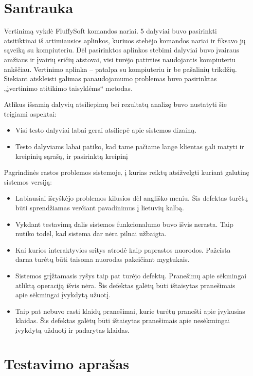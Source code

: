 \section{Santrauka}

	Vertinimą vykdė FluffySoft komandos nariai.
	5 dalyviai buvo pasirinkti atsitiktinai iš artimiausios aplinkos, kuriuos stebėjo komandos nariai ir fiksavo jų sąveiką su kompiuteriu.
	Dėl pasirinktos aplinkos stebimi dalyviai buvo įvairaus amžiaus ir įvairių sričių atstovai, visi turėjo patirties naudojantis kompiuteriu ankščiau.
	Vertinimo aplinka – patalpa su kompiuteriu ir be pašalinių trikdžių.
	Siekiant atskleisti galimas panaudojamumo problemas buvo pasirinktas „įvertinimo atitikimo taisyklėms“ metodas.
	
	Atlikus išsamią dalyvių atsiliepimų bei rezultatų analizę buvo nustatyti šie teigiami aspektai:
	\begin{itemize}
		\item Visi testo dalyviai labai gerai atsiliepė apie sistemos dizainą.
		\item Testo dalyviams labai patiko, kad tame pačiame lange klientas gali matyti ir kreipinių sąrašą, ir pasirinktą kreipinį
	\end{itemize}
	
	Pagrindinės rastos problemos sistemoje, į kurias reiktų atsižvelgti kuriant galutinę sistemos versiją:
	\begin{itemize}
		\item Labiausiai išryškėjo problemos kilusios dėl angliško meniu.
		Šis defektas turėtų būti sprendžiamas verčiant pavadinimus į lietuvių kalbą.
		\item Vykdant testavimą dalis sistemos funkcionalumo buvo išvis nerasta.
		Taip nutiko todėl, kad sistema dar nėra pilnai užbaigta.
		\item Kai kurios interaktyvios sritys atrodė kaip paprastos nuorodos.
		Pažeista darna turėtų būti taisoma nuorodas pakeičiant mygtukais.
		\item Sistemos grįžtamasis ryšys taip pat turėjo defektų.
		Pranešimų apie sėkmingai atliktą operaciją išvis nėra.
		Šis defektas galėtų būti ištaisytas pranešimais apie sėkmingai įvykdytą užuotį.
		\item Taip pat nebuvo rasti klaidų pranešimai, kurie turėtų pranešti apie įvykusias klaidas.
		Šis defektas galėtų būti ištaisytas pranešimais apie nesėkmingai įvykdytą užduotį ir padarytas klaidas.
	\end{itemize}

\section{Testavimo aprašas}

